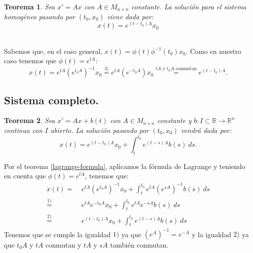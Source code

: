 \documentclass[11pt, a4paper,twoside]{article}
\makeatletter
\theoremstyle{theorem-style}  %
\newtheorem{theorem}{Teorema}[section]  %
\renewenvironment{proof}[1][\proofname]{\par
	\pushQED{\qed}%
	\normalfont \topsep6\p@\@plus6\p@\relax
	\list{}{%
		\settowidth{\leftmargin}{\quad:\hskip\labelsep}%
		\setlength{\labelwidth}{0pt}%
		\setlength{\itemindent}{-\leftmargin}%
	}%
	\item[\hskip\labelsep\itshape#1\@addpunct{:}]\ignorespaces
}{%
	\popQED\endlist\@endpefalse
}
\theoremstyle{definition-style}
\theoremstyle{example-style}
\makeatother
\begin{document}
\begin{theorem}
	Sea $x' = Ax$ con $A \in M_{n \times n}$ constante. La solución para el sistema homogéneo pasando por $(t_0, x_0)$ viene dada por:
	\[x(t) = e^{(t - t_0)A}x_0\]
\end{theorem}
\begin{proof}\ \\
	Sabemos que, en el caso general, $x(t) = \phi (t) \phi^{-1} (t_0) x_0$. Como en nuestro caso tenemos que $\phi (t) = e^{tA}$:
	\[x(t) = e^{tA}(e^{t_0A})^{-1}x_0 \stackrel{3)}{=} e^{tA}(e^{-t_0A})x_0 \stackrel{tA \text{ y } t_0A \text{ conmutan}}{=} e^{(t - t_0)A}.\]
\end{proof}
\subsection{Sistema completo.}
\begin{theorem}
	Sea $x' = Ax + b(t)$ con $A \in M_{n \times n}$ constante y $ b:I \subset \mathbb{R} \longrightarrow \mathbb{R}^n $	continua con $I$ abierto. La solución pasando por $(t_0, x_0)$ vendrá dada por:
	\[x(t) = e^{(t - t_0)A}x_0 + \int_{t}^{t_0}e^{(t - s)A}b(s) \ ds.\]
\end{theorem}
\begin{proof}
	Por el teorema \ref{lagrange-formula}, aplicamos la fórmula de Lagrange y teniendo en cuenta que $\phi (t) = e^{tA}$, tenemos que:
	\begin{align*}
	x(t) =& \ e^{tA}(e^{t_0A})^{-1}x_0 + \int_{t}^{t_0} e^{tA}(e^{sA})^{-1} b(s) \ ds  \\
	\stackrel{1)}{=}& \ e^{tA}e^{-t_0A}x_0 + \int_{t}^{t_0}e^{tA}e^{-sA} b(s) \ ds \\
	\stackrel{2)}{=}& \ e^{(t-t_0)A}x_0 + \int_{t}^{t_0}e^{(t-s)A} b(s) \ ds
	\end{align*}
	Tenemos que se cumple la igualdad $1)$ ya que $(e^A)^{-1} = e^{-A}$ y la igualdad $2)$ ya que $t_0A$ y $tA$ conmutan y $tA$ y $sA$ también conmutan.
\end{proof}
\end{document}
